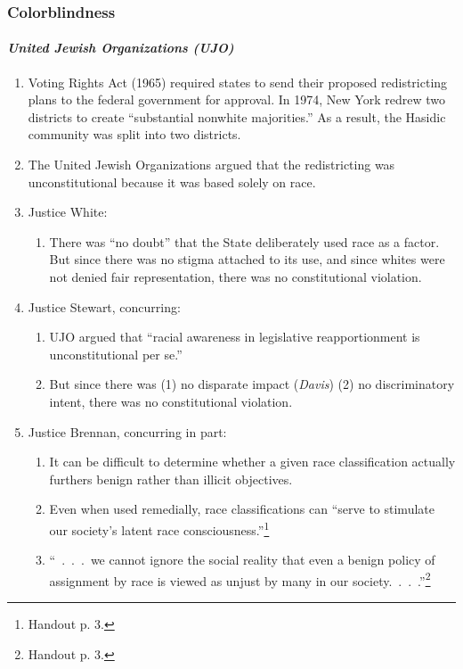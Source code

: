 \subsubsection{Colorblindness}

\paragraph{\emph{United Jewish Organizations (UJO)}}

\begin{enumerate}
    \item Voting Rights Act (1965) required states to send their proposed 
    redistricting plans to the federal government for approval. In 1974, New 
    York redrew two districts to create ``substantial nonwhite majorities.'' 
    As a result, the Hasidic community was split into two districts.
    \item The United Jewish Organizations argued that the redistricting was 
    unconstitutional because it was based solely on race.
    \item Justice White:
    \begin{enumerate}
        \item There was ``no doubt'' that the State deliberately used race as 
        a factor. But since there was no stigma attached to its use, and since 
        whites were not denied fair representation, there was no 
        constitutional violation.
    \end{enumerate}
    \item Justice Stewart, concurring:
    \begin{enumerate}
        \item UJO argued that ``racial awareness in legislative 
        reapportionment is unconstitutional per se.''
        \item But since there was (1) no disparate impact (\emph{Davis}) (2) 
        no discriminatory intent, there was no constitutional violation.
    \end{enumerate}
    \item Justice Brennan, concurring in part:
    \begin{enumerate}
        \item It can be difficult to determine whether a given race 
        classification actually furthers benign rather than illicit 
        objectives.
        \item Even when used remedially, race classifications can ``serve to 
        stimulate our society's latent race consciousness.''\footnote{Handout 
        p. 3.}
        \item ``~.~.~.~we cannot ignore the social reality that even a benign 
        policy of assignment by race is viewed as unjust by many in our 
        society.~.~.~.''\footnote{Handout p. 3.}
    \end{enumerate}
\end{enumerate}

